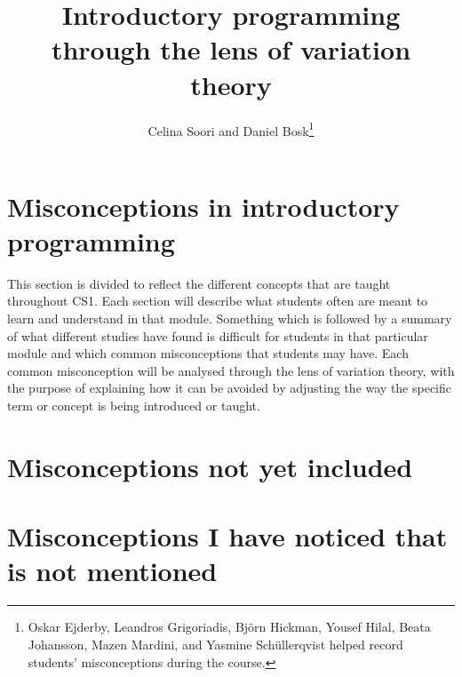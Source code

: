 \documentclass[onecolumn]{article}
\title{%
  Introductory programming\\
  through the lens of variation theory
}
\author{%
  Celina Soori and
  Daniel Bosk\thanks{%
    Oskar Ejderby,
    Leandros Grigoriadis,
    Björn Hickman,
    Yousef Hilal,
    Beata Johansson,
    Mazen Mardini, and
    Yasmine Schüllerqvist
    helped record students' misconceptions during the course.
  }%
}
\begin{document}

\maketitle
\begin{abstract}
  
\end{abstract}
\clearpage
\tableofcontents
\clearpage












\section{Misconceptions in introductory programming}
\label{misconceptions}

This section is divided to reflect the different concepts that are taught 
throughout CS1. Each section will describe what students often are meant to 
learn and understand in that module. Something which is followed by a 
summary 
of what different studies have found is difficult for students in that 
particular
module and which common misconceptions that students may have. Each common 
misconception will be analysed through the lens of variation theory, with 
the purpose of explaining how it can be avoided by adjusting the way 
the specific term or concept is being introduced or taught. 











\newpage
\printbibliography

\newpage

\appendix

\section{Misconceptions not yet included}




\section{Misconceptions I have noticed that is not mentioned}
\end{document}
